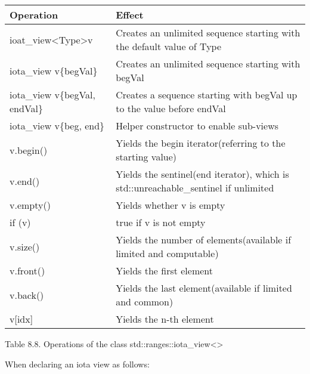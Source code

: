 \begin{longtable}[c]{|l|l|}
\hline
\textbf{Operation}       & \textbf{Effect}                                                    \\ \hline
\endfirsthead
%
\endhead
%
ioat\_view\textless{}Type\textgreater v & Creates an unlimited sequence starting with the default value of Type               \\ \hline
iota\_view v\{begVal\}   & Creates an unlimited sequence starting with begVal                 \\ \hline
iota\_view v\{begVal, endVal\}          & Creates a sequence starting with begVal up to the value before endVal               \\ \hline
iota\_view v\{beg, end\} & Helper constructor to enable sub-views                             \\ \hline
v.begin()                & Yields the begin iterator(referring to the starting value)         \\ \hline
v.end()                                 & Yields the sentinel(end iterator), which is std::unreachable\_sentinel if unlimited \\ \hline
v.empty()                & Yields whether v is empty                                          \\ \hline
if (v)                   & true if v is not empty                                             \\ \hline
v.size()                 & Yields the number of elements(available if limited and computable) \\ \hline
v.front()                & Yields the first element                                           \\ \hline
v.back()                 & Yields the last element(available if limited and common)           \\ \hline
v{[}idx{]}               & Yields the n-th element                                            \\ \hline
\end{longtable}

\begin{center}
Table 8.8. Operations of the class std::ranges::iota\_view<>
\end{center}

When declaring an iota view as follows:

